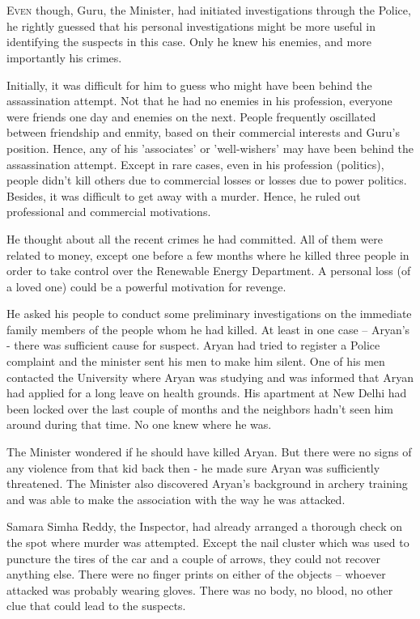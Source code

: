 \chapter{}

\lettrine{E}{ven} though, Guru, the Minister, had initiated investigations through the
Police, he rightly guessed that his personal investigations might be more useful
in identifying the suspects in this case. Only he knew his enemies, and more
importantly his crimes.

Initially, it was difficult for him to guess who might have been behind the
assassination attempt. Not that he had no enemies in his profession, everyone
were friends one day and enemies on the next. People frequently oscillated
between friendship and enmity, based on their commercial interests and Guru's
position. Hence, any of his 'associates' or 'well-wishers' may have been behind
the assassination attempt. Except in rare cases, even in his profession
(politics), people didn't kill others due to commercial losses or losses due to
power politics. Besides, it was difficult to get away with a murder. Hence, he
ruled out professional and commercial motivations.

He thought about all the recent crimes he had committed. All of them were
related to money, except one before a few months where he killed three people in
order to take control over the Renewable Energy Department. A personal loss (of
a loved one) could be a powerful motivation for revenge.

He asked his people to conduct some preliminary investigations on the immediate
family members of the people whom he had killed. At least in one case – Aryan's
- there was sufficient cause for suspect. Aryan had tried to register a Police
complaint and the minister sent his men to make him silent. One of his men
contacted the University where Aryan was studying and was informed that Aryan
had applied for a long leave on health grounds. His apartment at New Delhi had
been locked over the last couple of months and the neighbors hadn't seen him
around during that time. No one knew where he was.

The Minister wondered if he should have killed Aryan. But there were no signs of
any violence from that kid back then - he made sure Aryan was sufficiently
threatened. The Minister also discovered Aryan's background in archery training
and was able to make the association with the way he was attacked.

Samara Simha Reddy, the Inspector, had already arranged a thorough check on the
spot where murder was attempted. Except the nail cluster which was used to
puncture the tires of the car and a couple of arrows, they could not recover
anything else. There were no finger prints on either of the objects – whoever
attacked was probably wearing gloves. There was no body, no blood, no other clue
that could lead to the suspects.

